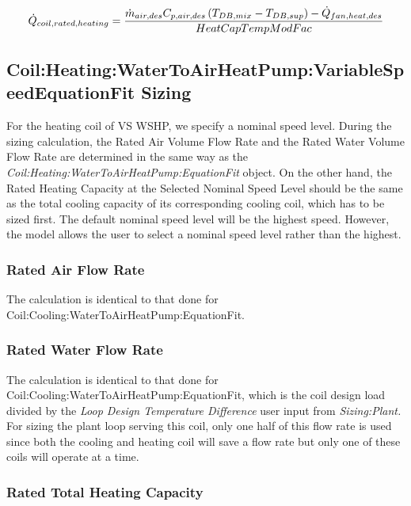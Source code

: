 \begin{equation}
  \dot{Q}_{coil,rated,heating} = \frac{\dot{m}_{air,des}C_{p,air,des}\left(T_{DB,mix}-T_{DB,sup}\right)- \dot{Q}_{fan,heat,des}}{HeatCapTempModFac}
\end{equation}

\subsection{Coil:Heating:WaterToAirHeatPump:VariableSpeedEquationFit Sizing}\label{coilheatingwatertoairheatpumpvariablespeedequationfit-sizing}

For the heating coil of VS WSHP, we specify a nominal speed level. During the sizing calculation, the Rated Air Volume Flow Rate and the Rated Water Volume Flow Rate are determined in the same way as the \emph{Coil:Heating:WaterToAirHeatPump:EquationFit} object. On the other hand, the Rated Heating Capacity at the Selected Nominal Speed Level should be the same as the total cooling capacity of its corresponding cooling coil, which has to be sized first. The default nominal speed level will be the highest speed. However, the model allows the user to select a nominal speed level rather than the highest.

\subsubsection{Rated Air Flow Rate}\label{rated-air-flow-rate-3}

The calculation is identical to that done for Coil:Cooling:WaterToAirHeatPump:EquationFit.

\subsubsection{Rated Water Flow Rate}\label{rated-water-flow-rate-3}

The calculation is identical to that done for Coil:Cooling:WaterToAirHeatPump:EquationFit, which is the coil design load divided by the \emph{Loop Design Temperature Difference} user input from \emph{Sizing:Plant.} For sizing the plant loop serving this coil, only one half of this flow rate is used since both the cooling and heating coil will save a flow rate but only one of these coils will operate at a time.

\subsubsection{Rated Total Heating Capacity}\label{rated-total-heating-capacity-1}

